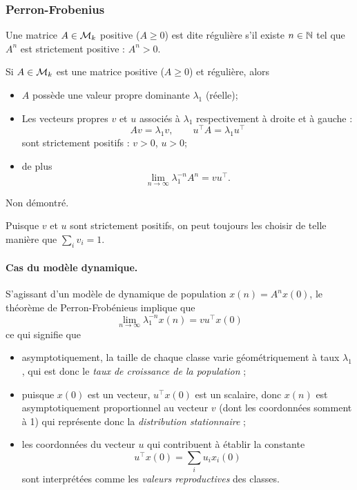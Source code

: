 \subsubsection{Perron-Frobenius}

\begin{definition}
  Une matrice $A \in \mathcal{M}_k$ positive ($A \geq 0$) est dite régulière s'il existe $n \in \mathbb{N}$ tel que $A^n$ est strictement positive : $A^n > 0$.
\end{definition}

\begin{theorem} \label{thm:perronFrobenius}
  Si $A \in \mathcal{M}_k$ est une matrice positive ($A \geq 0$) et régulière, alors
  \begin{itemize}
    \item $A$ possède une valeur propre dominante $\lambda_1$ (réelle);
    \item Les vecteurs propres $v$ et $u$ associés à $\lambda_1$ respectivement à droite et à gauche : 
    $$
    A v = \lambda_1 v, \qquad u^\top A = \lambda_1 u^\top
    $$
    sont strictement positifs : $v > 0$, $u > 0$;
    \item de plus
    $$
    \lim_{n \to \infty} \lambda_1^{-n} A^n = v u^\top.
    $$
  \end{itemize}
\end{theorem}

\proof
Non démontré. 
\eproof

\remark
Puisque $v$ et $u$ sont strictement positifs, on peut toujours les choisir de telle manière que $\sum_i v_i = 1$.

\paragraph{Cas du modèle dynamique.}
S'agissant d'un modèle de dynamique de population $x(n) = A^n x(0)$, le théorème de Perron-Frobénieus implique que 
$$
\lim_{n \to \infty} \lambda_1^{-n} x(n) = v u^\top x(0)
$$
ce qui signifie que
\begin{itemize}
 \item asymptotiquement, la taille de chaque classe varie géométriquement à taux $\lambda_1$, qui est donc le {\em taux de croissance de la population} ; 
 \item puisque $x(0)$ est un vecteur, $u^\top x(0)$ est un scalaire, donc $x(n)$ est asymptotiquement proportionnel au vecteur $v$ (dont les coordonnées somment à 1) qui représente donc la {\em distribution stationnaire} ;
 \item les coordonnées du vecteur $u$ qui contribuent à établir la constante 
 $$
 u^\top x(0) = \sum_i u_i x_i(0)
 $$
 sont interprétées comme les {\em valeurs reproductives} des classes.
\end{itemize}

